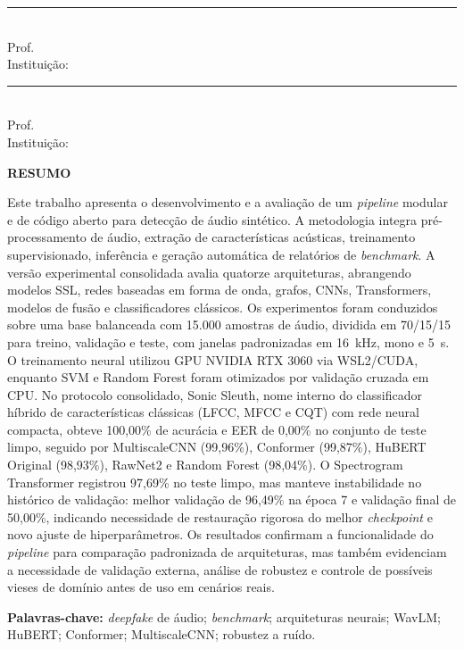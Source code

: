 \documentclass[12pt,a4paper]{article}
\begin{document}
\vspace{0.8cm}
\noindent\rule{10cm}{0.4pt}\\
Prof.\ \underline{\hspace{6cm}}\\
Instituição: \underline{\hspace{5.2cm}}

\vspace{0.8cm}
\noindent\rule{10cm}{0.4pt}\\
Prof.\ \underline{\hspace{6cm}}\\
Instituição: \underline{\hspace{5.2cm}}

\newpage
\pagestyle{fancy}

\begin{center}\textbf{RESUMO}\end{center}
\vspace{0.5cm}

\begin{singlespace}
\noindent
Este trabalho apresenta o desenvolvimento e a avaliação de um \textit{pipeline}
modular e de código aberto para detecção de áudio sintético. A metodologia
integra pré-processamento de áudio, extração de características acústicas,
treinamento supervisionado, inferência e geração automática de relatórios de
\textit{benchmark}. A versão experimental consolidada avalia quatorze
arquiteturas, abrangendo modelos SSL, redes baseadas em forma de onda, grafos,
CNNs, Transformers, modelos de fusão e classificadores clássicos. Os
experimentos foram conduzidos sobre uma base balanceada com 15.000 amostras de
áudio, dividida em 70/15/15 para treino, validação e teste, com janelas
padronizadas em \SI{16}{\kilo\hertz}, mono e \SI{5}{\second}.
O treinamento neural utilizou GPU NVIDIA RTX 3060 via WSL2/CUDA, enquanto SVM
e Random Forest foram otimizados por validação cruzada em CPU. No protocolo
consolidado, Sonic Sleuth, nome interno do classificador híbrido de
características clássicas (LFCC, MFCC e CQT) com rede neural compacta, obteve
100,00\% de acurácia e EER de 0,00\% no conjunto de teste limpo,
seguido por MultiscaleCNN (99,96\%), Conformer (99,87\%), HuBERT Original
(98,93\%), RawNet2 e Random Forest (98,04\%). O Spectrogram Transformer
registrou 97,69\% no teste limpo, mas manteve instabilidade no histórico de
validação: melhor validação de 96,49\% na época 7 e validação final de
50,00\%, indicando necessidade de restauração rigorosa do melhor
\textit{checkpoint} e novo ajuste de hiperparâmetros. Os resultados confirmam a funcionalidade do \textit{pipeline}
para comparação padronizada de arquiteturas, mas também evidenciam a necessidade
de validação externa, análise de robustez e controle de possíveis vieses de
domínio antes de uso em cenários reais.

\vspace{0.4cm}
\noindent\textbf{Palavras-chave:} \textit{deepfake} de áudio;
\textit{benchmark}; arquiteturas neurais; WavLM; HuBERT; Conformer;
MultiscaleCNN; robustez a ruído.
\end{singlespace}
\end{document}
